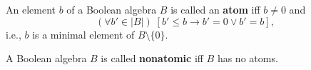 An element $b$ of a Boolean algebra $B$ is called an \textbf{atom} iff $b \neq 0$ and
$$(\forall b' \in |B|) \; [b' \leq b \rightarrow b' = 0 \vee b' = b],$$
i.e., $b$ is a minimal element of $B \setminus \{0\}$.

A Boolean algebra $B$ is called \textbf{nonatomic} iff $B$ has no atoms.
